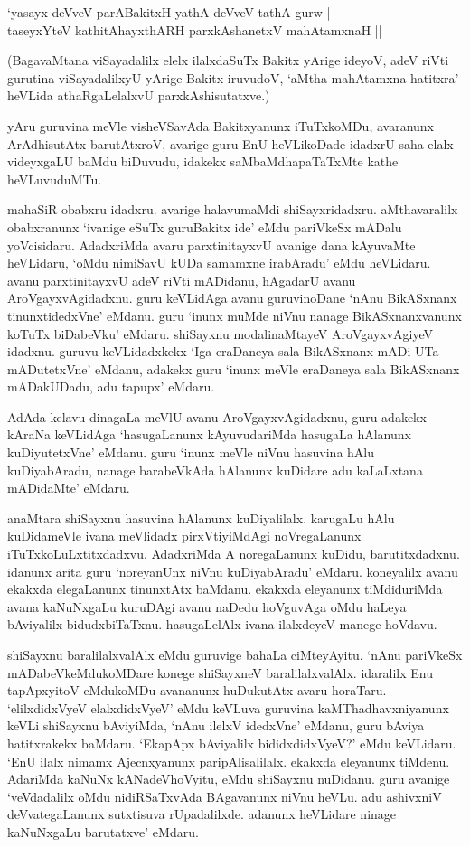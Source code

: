 \begin{shloka} 
`yasayx deVveV parABakitxH yathA deVveV tathA gurw |\\
taseyxYteV kathitAhayxthARH parxkAshanetxV mahAtamxnaH ||
\end{shloka}

(BagavaMtana viSayadalilx elelx ilalxdaSuTx Bakitx yArige ideyoV, adeV riVti gurutina viSayadalilxyU yArige Bakitx iruvudoV, `aMtha mahAtamxna hatitxra' heVLida athaRgaLelalxvU parxkAshisutatxve.)

yAru guruvina meVle visheVSavAda Bakitxyanunx iTuTxkoMDu, avaranunx ArAdhisutAtx barutAtxroV, avarige guru EnU heVLikoDade idadxrU saha elalx videyxgaLU baMdu biDuvudu, idakekx saMbaMdhapaTaTxMte kathe heVLuvuduMTu. 

mahaSiR obabxru idadxru. avarige halavumaMdi shiSayxridadxru. aMthavaralilx obabxranunx `ivanige eSuTx guruBakitx ide' eMdu pariVkeSx mADalu yoVcisidaru. AdadxriMda avaru parxtinitayxvU avanige dana kAyuvaMte heVLidaru, `oMdu nimiSavU kUDa samamxne irabAradu' eMdu heVLidaru. avanu parxtinitayxvU adeV riVti mADidanu, hAgadarU avanu AroVgayxvAgidadxnu. guru keVLidAga avanu guruvinoDane `nAnu BikASxnanx tinunxtidedxVne' eMdanu. guru `inunx muMde niVnu nanage BikASxnanxvanunx koTuTx biDabeVku' eMdaru. shiSayxnu modalinaMtayeV AroVgayxvAgiyeV idadxnu. guruvu keVLidadxkekx `Iga eraDaneya sala BikASxnanx mADi UTa mADutetxVne' eMdanu, adakekx guru `inunx meVle eraDaneya sala BikASxnanx mADakUDadu, adu tapupx' eMdaru. 


AdAda kelavu dinagaLa meVlU avanu AroVgayxvAgidadxnu, guru adakekx kAraNa keVLidAga `hasugaLanunx kAyuvudariMda hasugaLa hAlanunx kuDiyutetxVne' eMdanu. guru `inunx meVle niVnu hasuvina hAlu kuDiyabAradu, nanage barabeVkAda hAlanunx kuDidare adu kaLaLxtana mADidaMte' eMdaru. 


anaMtara shiSayxnu hasuvina hAlanunx kuDiyalilalx. karugaLu hAlu kuDidameVle ivana meVlidadx pirxVtiyiMdAgi noVregaLanunx iTuTxkoLuLxtitxdadxvu. AdadxriMda A noregaLanunx kuDidu, barutitxdadxnu. idanunx arita guru `noreyanUnx niVnu kuDiyabAradu' eMdaru. koneyalilx avanu ekakxda elegaLanunx tinunxtAtx baMdanu. ekakxda eleyanunx tiMdiduriMda avana kaNuNxgaLu kuruDAgi avanu naDedu hoVguvAga oMdu haLeya bAviyalilx bidudxbiTaTxnu. hasugaLelAlx ivana ilalxdeyeV manege hoVdavu. 

shiSayxnu baralilalxvalAlx eMdu guruvige bahaLa ciMteyAyitu. `nAnu pariVkeSx mADabeVkeMdukoMDare konege shiSayxneV baralilalxvalAlx. idaralilx Enu tapApxyitoV eMdukoMDu avananunx huDukutAtx avaru horaTaru. `elilxdidxVyeV elalxdidxVyeV' eMdu keVLuva guruvina kaMThadhavxniyanunx keVLi shiSayxnu bAviyiMda, `nAnu ilelxV idedxVne' eMdanu, guru bAviya hatitxrakekx baMdaru. `EkapApx bAviyalilx bididxdidxVyeV?' eMdu keVLidaru. `EnU ilalx nimamx Ajecnxyanunx paripAlisalilalx. ekakxda eleyanunx tiMdenu. AdariMda kaNuNx kANadeVhoVyitu, eMdu shiSayxnu nuDidanu. guru avanige `veVdadalilx oMdu nidiRSaTxvAda BAgavanunx niVnu heVLu. adu ashivxniV deVvategaLanunx sutxtisuva rUpadalilxde. adanunx heVLidare ninage kaNuNxgaLu barutatxve' eMdaru. 

